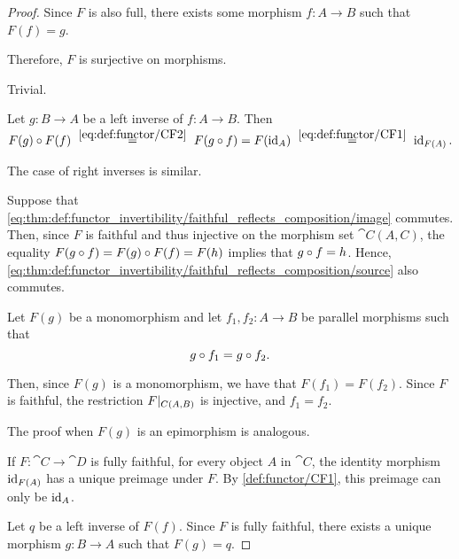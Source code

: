 \begin{proof}
  Since \( F \) is also full, there exists some morphism \( f: A \to B \) such that \( F(f) = g \).

  Therefore, \( F \) is surjective on morphisms.

   Trivial.

   Let \( g: B \to A \) be a left inverse of \( f: A \to B \). Then
  \begin{equation*}
    F(g) \bincirc F(f)
    \reloset {\eqref{eq:def:functor/CF2}} =
    F(g \bincirc f)
    =
    F(\id_A)
    \reloset {\eqref{eq:def:functor/CF1}} =
    \id_{F(A)}.
  \end{equation*}

  The case of right inverses is similar.

   Suppose that \eqref{eq:thm:def:functor_invertibility/faithful_reflects_composition/image} commutes. Then, since \( F \) is faithful and thus injective on the morphism set \( \cat{C}(A, C) \), the equality \( F(g \bincirc f) = F(g) \bincirc F(f) = F(h) \) implies that \( g \bincirc f = h \). Hence, \eqref{eq:thm:def:functor_invertibility/faithful_reflects_composition/source} also commutes.

   Let \( F(g) \) be a monomorphism and let \( f_1, f_2: A \to B \) be parallel morphisms such that
  \begin{equation*}
    g \bincirc f_1 = g \bincirc f_2.
  \end{equation*}

  Then, since \( F(g) \) is a monomorphism, we have that \( F(f_1) = F(f_2) \). Since \( F \) is faithful, the restriction \( F\vert_{C(A, B)} \) is injective, and \( f_1 = f_2 \).

  The proof when \( F(g) \) is an epimorphism is analogous.

   If \( F: \cat{C} \to \cat{D} \) is fully faithful, for every object \( A \) in \( \cat{C} \), the identity morphism \( \operatorname{id}_{F(A)} \) has a unique preimage under \( F \). By \ref{def:functor/CF1}, this preimage can only be \( \operatorname{id}_A \).

   Let \( q \) be a left inverse of \( F(f) \). Since \( F \) is fully faithful, there exists a unique morphism \( g: B \to A \) such that \( F(g) = q \).


\end{proof}
